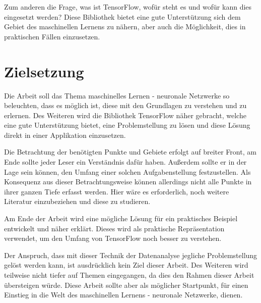 \noindent
Zum anderen die Frage, was ist TensorFlow, wofür steht es und wofür kann dies eingesetzt werden?  
Diese Bibliothek bietet eine gute Unterstützung sich dem Gebiet des maschinellen Lernens zu nähern, aber auch die Möglichkeit, dies in praktischen Fällen einzusetzen. 

\section{Zielsetzung}

Die Arbeit soll das Thema maschinelles Lernen - neuronale Netzwerke so beleuchten, dass es möglich ist, diese mit den Grundlagen zu verstehen und zu erlernen. 
Des Weiteren wird die Bibliothek TensorFlow näher gebracht, welche eine gute Unterstützung bietet, eine Problemstellung zu lösen und diese Lösung direkt in einer Applikation einzusetzen. \newline

\noindent
Die Betrachtung der benötigten Punkte und Gebiete erfolgt auf breiter Front, am Ende sollte jeder Leser ein Verständnis dafür haben. 
Außerdem sollte er in der Lage sein können, den Umfang einer solchen Aufgabenstellung festzustellen. 
Als Konsequenz aus dieser Betrachtungsweise können allerdings nicht alle Punkte in ihrer ganzen Tiefe erfasst werden. 
Hier wäre es erforderlich, noch weitere Literatur einzubeziehen und diese zu studieren. \newline

\noindent
Am Ende der Arbeit wird eine mögliche Lösung für ein praktisches Beispiel entwickelt und näher erklärt.
Dieses wird als praktische Repräsentation verwendet, um den Umfang von TensorFlow noch besser zu verstehen. \newline

\noindent
Der Anspruch, dass mit dieser Technik der Datenanalyse jegliche Problemstellung gelöst werden kann, ist ausdrücklich kein Ziel dieser Arbeit. 
Des Weiteren wird teilweise nicht tiefer auf Themen eingegangen, da dies den Rahmen dieser Arbeit übersteigen würde. 
Diese Arbeit sollte aber als möglicher Startpunkt, für einen Einstieg in die Welt des maschinellen Lernens - neuronale Netzwerke, dienen. 